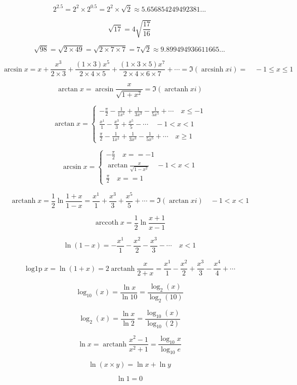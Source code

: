 \documentclass{article}
\DeclareMathOperator{\arcsinh}{arcsinh}
\DeclareMathOperator{\arctanh}{arctanh}
\DeclareMathOperator{\arccoth}{arccoth}
\DeclareMathOperator{\logonep}{log1p}
\begin{document}
\center

$$2^{2.5} = 2^2 \times 2^{0.5} = 2^2 \times \sqrt{2} \approx 5.656854249492381...$$

$$\sqrt{17} = 4\sqrt{\frac{17}{16}}$$

$$\sqrt{98} = \sqrt{2\times49} = \sqrt{2\times7\times7} = 7\sqrt{2}\approx9.899494936611665...$$

$$\arcsin x =
x + \frac{x^3}{2\times3} + \frac{(1\times3)x^5}{2\times4\times5} +
\frac{(1\times3\times5)x^7}{2\times4\times6\times7}+\cdots =
\Im(\arcsinh xi) = \quad-1\leq x \leq1$$

$$\arctan x = \arcsin\frac{x}{\sqrt{1+x^2}} = \Im(\arctanh xi)$$

$$
\arctan x=\left\{\begin{array}{l}
-\frac{\pi}{2} - \frac{1}{1x^1} + \frac{1}{3x^3} - \frac{1}{5x^5} + \cdots\quad x \leq-1\\
\frac{x^1}{1} - \frac{x^3}{3} + \frac{x^5}{5} - \cdots\quad -1 < x < 1\\
\frac{\pi}{2} - \frac{1}{1x^1} + \frac{1}{3x^3} - \frac{1}{5x^5} + \cdots\quad x \geq 1
\end{array}\right.
$$

$$
\arcsin x =\left\{\begin{array}{l}
-\frac{\pi}{2}\quad x == -1\\
\arctan\frac{x}{\sqrt{1-x^2}}\quad -1 < x < 1\\
\frac{\pi}{2}\quad x == 1
\end{array}\right.
$$

$$\arctanh x = \frac{1}{2}\ln\frac{1 + x}{1 - x} =
\frac{x^1}{1} + \frac{x^3}{3} + \frac{x^5}{5} +\cdots =
\Im(\arctan xi) \quad-1 < x < 1$$

$$\arccoth x = \frac{1}{2}\ln\frac{x + 1}{x - 1}$$

$$\ln(1-x) = -\frac{x^1}{1} - \frac{x^2}{2} - \frac{x^3}{3} - \cdots\quad x < 1$$

$$\logonep x = \ln(1+x) =
2\arctanh\frac{x}{2+x}=
\frac{x^1}{1} - \frac{x^2}{2} + \frac{x^3}{3} - \frac{x^4}{4} + \cdots$$

$$\log_{10}(x) = \frac{\ln{x}}{\ln{10}} = \frac{\log_2(x)}{\log_2(10)}$$

$$\log_2(x) = \frac{\ln{x}}{\ln{2}} = \frac{\log_{10}(x)}{\log_{10}(2)}$$

$$\ln x = \arctanh\frac{x^2-1}{x^2+1} = \frac{\log_{10}x}{\log_{10}e}$$

$$\ln(x\times y) = \ln x + \ln y$$

$$\ln 1 = 0$$
\end{document}
